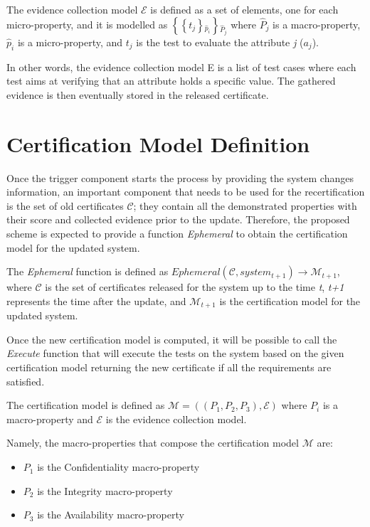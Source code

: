 \begin{defn}
The evidence collection model \(\mathcal{E}\) is defined as a set of elements, one for each micro-property, and it is modelled as \(  \left \{ \left \{ t_j \right \} {_{\hat{p}_i}} \right \} {_{\hat{P}_j}} \) where \( \hat{P}_j \) is a macro-property, \( \hat{p}_i \) is a micro-property, and \(t_j\) is the test to evaluate the attribute \textit{j} (\(a_j\)).
\end{defn}

In other words, the evidence collection model E is a list of test cases where each test aims at verifying that an attribute holds a specific value. The gathered evidence is then eventually stored in the released certificate.

\section{Certification Model Definition}
Once the trigger component starts the process by providing the system changes information, an important component that needs to be used for the recertification is the set of old certificates \(\mathcal{C}\); they contain all the demonstrated properties with their score and collected evidence prior to the update. Therefore, the proposed scheme is expected to provide a function \textit{Ephemeral} to obtain the certification model for the updated system.

\begin{defn}
The \textit{Ephemeral} function is defined as \(Ephemeral(\mathcal{C}, system_{t+1}) \rightarrow {\mathcal{M}}_{t+1} \), where 
\(\mathcal{C}\) is the set of certificates released for the system up to the time \textit{t}, \textit{t+1} represents the time after the update, and \(\mathcal{M}_{t+1}\) is the certification model for the updated system.
\end{defn}

Once the new certification model is computed, it will be possible to call the \textit{Execute} function that will execute the tests on the system based on the given certification model returning the new certificate if all the requirements are satisfied. 

\begin{defn}
The certification model is defined as 
\(\mathcal{M} = \left ( \left ( P_1, P_2, P_3 \right ), \mathcal{E} \right )\) where \(P_i\) is a macro-property and \( \mathcal{E} \) is the evidence collection model.
\end{defn}
Namely, the macro-properties that compose the certification model \(\mathcal{M}\) are:
\begin{itemize}
    \item \(P_1\) is the Confidentiality macro-property
    \item \(P_2\) is the Integrity macro-property
    \item \(P_3\) is the Availability macro-property
\end{itemize}
 
